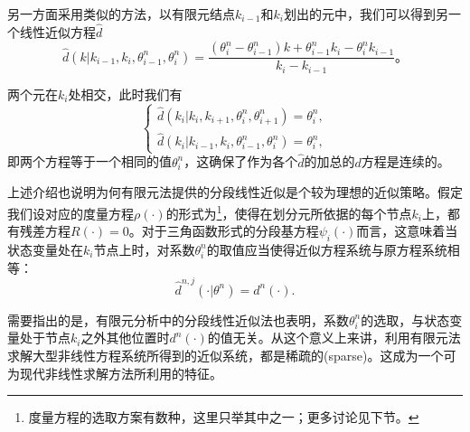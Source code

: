 另一方面采用类似的方法，以有限元结点$k_{i-1}$和$k_{i}$划出的元中，我们可以得到另一个线性近似方程$\hat{d}$
\begin{equation*}
  \hat{d} \left( k | k_{i-1}, k_{i}, \theta^n_{i-1}, \theta^n_{i} \right)=
  \frac{
  \left( \theta_{i}^n - \theta_{i-1}^n \right) k + \theta_{i-1}^n k_{i} - \theta_{i}^n k_{i-1}
  }{k_{i} - k_{i-1}}。
\end{equation*}

两个元在$k_i$处相交，此时我们有
\begin{equation*}
  \begin{cases}
    \hat{d} \left( k_{i} | k_{i}, k_{i+1}, \theta^n_i, \theta^n_{i+1} \right)  = \theta^n_i, \\
    \hat{d} \left( k_i | k_{i-1}, k_{i}, \theta^n_{i-1}, \theta^n_{i} \right)= \theta^n_i,
  \end{cases}
\end{equation*}
即两个方程等于一个相同的值$\theta^n_i$，这确保了作为各个$\hat{d}$的加总的$d$方程是连续的。

上述介绍也说明为何有限元法提供的分段线性近似是个较为理想的近似策略。假定我们设对应的度量方程$\rho(\cdot)$的形式为\footnote{度量方程的选取方案有数种，这里只举其中之一；更多讨论见下节。}，使得在划分元所依据的每个节点$k_i$上，都有残差方程$R(\cdot) = 0$。对于三角函数形式的分段基方程$\psi_i(\cdot)$而言，这意味着当状态变量处在$k_i$节点上时，对系数$\theta^n_i$的取值应当使得近似方程系统与原方程系统相等：
\begin{equation*}
  \hat{d}^{n,j}(\cdot | \theta^n) = d^n(\cdot).
\end{equation*}

需要指出的是，有限元分析中的分段线性近似法也表明，系数$\theta^n_i$的选取，与状态变量处于节点$k_i$之外其他位置时$d^n(\cdot)$的值无关。从这个意义上来讲，利用有限元法求解大型非线性方程系统所得到的近似系统，都是稀疏的(sparse)。这成为一个可为现代非线性求解方法所利用的特征。

